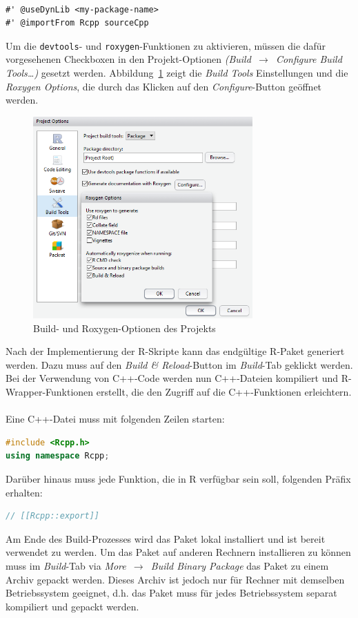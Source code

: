 \\
\begin{lstlisting}[caption=Notwendige \texttt{roxygen}-Kommentare bei der Verwendung von C++-Code, label={lst:rcppNamespace}, float=!th]
#' @useDynLib <my-package-name>
#' @importFrom Rcpp sourceCpp
\end{lstlisting}
Um die \texttt{devtools}- und \texttt{roxygen}-Funktionen zu aktivieren, müssen die dafür vorgesehenen Checkboxen in den Projekt-Optionen \emph{(Build~$\rightarrow$~Configure Build Tools\dots)} gesetzt werden. Abbildung~\ref{abb:build_roxygen_options} zeigt die \emph{Build Tools} Einstellungen und die \emph{Roxygen Options}, die durch das Klicken auf den \emph{Configure}-Button geöffnet werden.
\\
\begin{figure}[th]
	\centering
	\includegraphics[width=0.75\textwidth]{abbildungen/build_config}
	\caption{Build- und Roxygen-Optionen des Projekts}
	\label{abb:build_roxygen_options}
\end{figure}
Nach der Implementierung der R-Skripte kann das endgültige R-Paket generiert werden. Dazu muss auf den \emph{Build \& Reload}-Button im \emph{Build}-Tab geklickt werden. Bei der Verwendung von C++-Code werden nun C++-Dateien kompiliert und R-Wrapper-Funktionen erstellt, die den Zugriff auf die C++-Funktionen erleichtern.
\\
\\
Eine C++-Datei muss mit folgenden Zeilen starten:
\begin{lstlisting}[language=C++, numbers=none, basicstyle=\ttfamily]
#include <Rcpp.h>
using namespace Rcpp;
\end{lstlisting}
Darüber hinaus muss jede Funktion, die in R verfügbar sein soll, folgenden Präfix erhalten:
\begin{lstlisting}[language=C++, numbers=none, basicstyle=\ttfamily]
// [[Rcpp::export]]
\end{lstlisting}
Am Ende des Build-Prozesses wird das Paket lokal installiert und ist bereit verwendet zu werden. Um das Paket auf anderen Rechnern installieren zu können muss im \emph{Build}-Tab via \emph{More~$\rightarrow$~Build Binary Package} das Paket zu einem Archiv gepackt werden. Dieses Archiv ist jedoch nur für Rechner mit demselben Betriebssystem geeignet, d.h. das Paket muss für jedes Betriebssystem separat kompiliert und gepackt werden.

